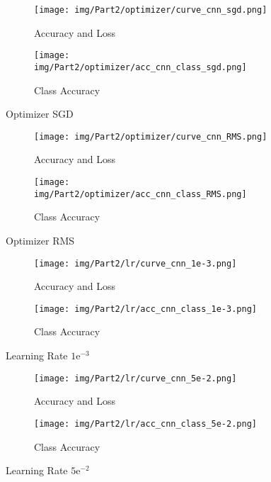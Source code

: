 \begin{appendix}
  \begin{figure}[!htbp]
    \centering
    \begin{subfigure}[b]{1\textwidth}
      \texttt{[image: img/Part2/optimizer/curve\_cnn\_sgd.png]}
      \caption{Accuracy and Loss}
    \end{subfigure}
    \begin{subfigure}[b]{1\textwidth}
      \texttt{[image: img/Part2/optimizer/acc\_cnn\_class\_sgd.png]}
      \caption{Class Accuracy}
    \end{subfigure}
    \caption{Optimizer SGD}
    \label{fig:p2_sgd}
  \end{figure}

  \begin{figure}[!htbp]
    \centering
    \begin{subfigure}[b]{1\textwidth}
      \texttt{[image: img/Part2/optimizer/curve\_cnn\_RMS.png]}
      \caption{Accuracy and Loss}
    \end{subfigure}
    \begin{subfigure}[b]{1\textwidth}
      \texttt{[image: img/Part2/optimizer/acc\_cnn\_class\_RMS.png]}
      \caption{Class Accuracy}
    \end{subfigure}
    \caption{Optimizer RMS}
    \label{fig:p2_RMS}
  \end{figure}

  \begin{figure}[!htbp]
    \centering
    \begin{subfigure}[b]{1\textwidth}
      \texttt{[image: img/Part2/lr/curve\_cnn\_1e-3.png]}
      \caption{Accuracy and Loss}
    \end{subfigure}
    \begin{subfigure}[b]{1\textwidth}
      \texttt{[image: img/Part2/lr/acc\_cnn\_class\_1e-3.png]}
      \caption{Class Accuracy}
    \end{subfigure}
    \caption{Learning Rate $1\mathrm{e}^{-3}$}
    \label{fig:p2_lr_1e-3}
  \end{figure}

  \begin{figure}[!htbp]
    \centering
    \begin{subfigure}[b]{1\textwidth}
      \texttt{[image: img/Part2/lr/curve\_cnn\_5e-2.png]}
      \caption{Accuracy and Loss}
    \end{subfigure}
    \begin{subfigure}[b]{1\textwidth}
      \texttt{[image: img/Part2/lr/acc\_cnn\_class\_5e-2.png]}
      \caption{Class Accuracy}
    \end{subfigure}
    \caption{Learning Rate $5\mathrm{e}^{-2}$}
    \label{fig:p2_lr_5e-2}
  \end{figure}


\end{appendix}
